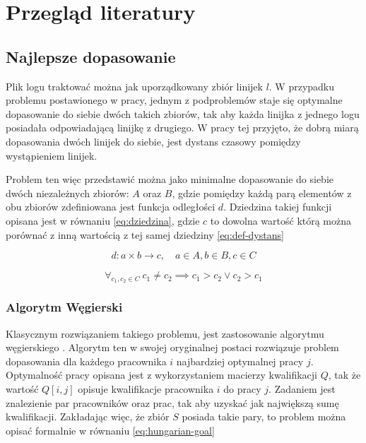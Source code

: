 \chapter{Przegląd literatury}

\section{Najlepsze dopasowanie}

Plik logu traktować można jak uporządkowany zbiór linijek $l$.
W przypadku problemu postawionego w pracy, jednym z podproblemów staje się
optymalne dopasowanie do siebie dwóch takich zbiorów, tak aby każda linijka z
jednego logu posiadała odpowiadającą linijkę z drugiego.
W pracy tej przyjęto, że dobrą miarą dopasowania dwóch linijek do siebie, jest
dystans czasowy pomiędzy wystąpieniem linijek.

Problem ten więc przedstawić można jako minimalne dopasowanie do siebie dwóch
niezależnych zbiorów: $A$ oraz $B$, gdzie pomiędzy każdą parą elementów z obu
zbiorów zdefiniowana jest funkcja odległości $d$. Dziedzina takiej funkcji
opisana jest w równaniu \ref{eq:dziedzina}, gdzie $c$ to dowolna wartość którą
można porównać z inną wartością z tej samej dziedziny \ref{eq:def-dystans}

\begin{equation}
  d: a \times b \rightarrow c, \quad a \in A, b \in B, c \in C \label{eq:dziedzina}
\end{equation}

\begin{equation}
  \forall_{c_1,c_2 \in C}\ c_1 \neq c_2 \implies c_1 > c_2 \lor c_2 > c_1 \label{eq:def-dystans}
\end{equation}

\todo{}

\subsection{Algorytm Węgierski}

Klasycznym rozwiązaniem takiego problemu, jest zastosowanie algorytmu
węgierskiego \cite{Hungarian}.
Algorytm ten w swojej oryginalnej postaci rozwiązuje problem dopasowania dla
każdego pracownika $i$ najbardziej optymalnej pracy $j$.
Optymalność pracy opisana jest z wykorzystaniem macierzy kwalifikacji $Q$, tak
że wartość $Q[i, j]$ opisuje kwalifikacje pracownika $i$ do pracy $j$.
Zadaniem jest znalezienie par pracowników oraz prac, tak aby uzyskać jak
największą sumę kwalifikacji.
Zakładając więc, że zbiór $S$ posiada takie pary, to problem można opisać
formalnie w równaniu \ref{eq:hungarian-goal}

